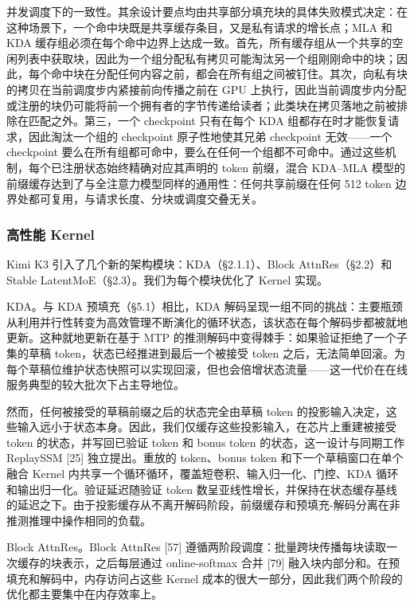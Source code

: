 并发调度下的一致性。其余设计要点均由共享部分填充块的具体失败模式决定：在这种场景下，一个命中块既是共享缓存条目，又是私有请求的增长点；MLA 和 KDA 缓存组必须在每个命中边界上达成一致。首先，所有缓存组从一个共享的空闲列表中获取块，因此为一个组分配私有拷贝可能淘汰另一个组刚刚命中的块；因此，每个命中块在分配任何内容之前，都会在所有组之间被钉住。其次，向私有块的拷贝在当前调度步内紧接前向传播之前在 GPU 上执行，因此当前调度步内分配或注册的块仍可能将前一个拥有者的字节传递给读者；此类块在拷贝落地之前被排除在匹配之外。第三，一个 checkpoint 只有在每个 KDA 组都存在时才能恢复请求，因此淘汰一个组的 checkpoint 原子性地使其兄弟 checkpoint 无效——一个 checkpoint 要么在所有组都可命中，要么在任何一个组都不可命中。通过这些机制，每个已注册状态始终精确对应其声明的 token 前缀，混合 KDA--MLA 模型的前缀缓存达到了与全注意力模型同样的通用性：任何共享前缀在任何 512 token 边界处都可复用，与请求长度、分块或调度交叠无关。

\subsubsection{高性能 Kernel}\label{high-performance-kernels}

Kimi K3 引入了几个新的架构模块：KDA（§2.1.1）、Block AttnRes（§2.2）和 Stable LatentMoE（§2.3）。我们为每个模块优化了 Kernel 实现。

KDA。与 KDA 预填充（§5.1）相比，KDA 解码呈现一组不同的挑战：主要瓶颈从利用并行性转变为高效管理不断演化的循环状态，该状态在每个解码步都被就地更新。这种就地更新在基于 MTP 的推测解码中变得棘手：如果验证拒绝了一个子集的草稿 token，状态已经推进到最后一个被接受 token 之后，无法简单回滚。为每个草稿位维护状态快照可以实现回滚，但也会倍增状态流量——这一代价在在线服务典型的较大批次下占主导地位。

然而，任何被接受的草稿前缀之后的状态完全由草稿 token 的投影输入决定，这些输入远小于状态本身。因此，我们仅缓存这些投影输入，在芯片上重建被接受 token 的状态，并写回已验证 token 和 bonus token 的状态，这一设计与同期工作 ReplaySSM {[}25{]} 独立提出。重放的 token、bonus token 和下一个草稿窗口在单个融合 Kernel 内共享一个循环循环，覆盖短卷积、输入归一化、门控、KDA 循环和输出归一化。验证延迟随验证 token 数呈亚线性增长，并保持在状态缓存基线的延迟之下。由于投影缓存从不离开解码阶段，前缀缓存和预填充-解码分离在非推测推理中操作相同的负载。

Block AttnRes。Block AttnRes {[}57{]} 遵循两阶段调度：批量跨块传播每块读取一次缓存的块表示，之后每层通过 online-softmax 合并 {[}79{]} 融入块内部分和。在预填充和解码中，内存访问占这些 Kernel 成本的很大一部分，因此我们两个阶段的优化都主要集中在内存效率上。

